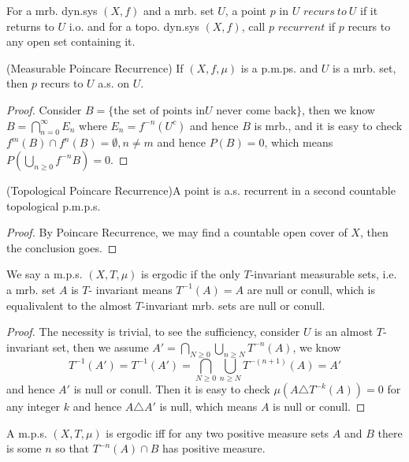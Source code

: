 \documentclass[lang=en, color=blue, ]{elegantbook}
\begin{document}
\begin{definition}
    For a mrb. dyn.sys $(X,f)$ and a mrb. set $U$, a point $p$ in $U$ $recurs\ to\ U$ if it returns to $U$ i.o. and for a topo. dyn.sys $(X,f)$, call $p$ $recurrent$ if $p$ recurs to any open set containing it.
\end{definition}
\begin{theorem}
    (Measurable Poincare Recurrence) If $(X,f,\mu)$ is a p.m.ps. and $U$ is a mrb. set, then $p$ recurs to $U$ a.s. on $U$.
\end{theorem}
\begin{proof}\par
Consider $B=\{\text{the set of points in} U\text{ never come back}\}$, then we know $B = \bigcap_{n=0}^{\infty}E_n$ where $E_n = f^{-n}(U^c)$ and hence $B$ is mrb., and it is easy to check $f^m(B)\cap f^n(B) = \emptyset, n\neq m$ and hence $P(B) = 0$, which means $P(\bigcup_{n\geq 0}f^{-n}{B}) = 0$.
\end{proof}
\begin{theorem}
(Topological Poincare Recurrence)A point is a.s. recurrent in a second countable topological p.m.p.s.
\end{theorem}
\begin{proof}\par
    By Poincare Recurrence, we may find a countable open cover of $X$, then the conclusion goes.
\end{proof}
\begin{definition}
    We say a m.p.s. $(X,T,\mu)$ is ergodic if the only $T$-invariant measurable sets, i.e. a mrb. set $A$ is $T$- invariant means $T^{-1}(A) = A$ are null or conull, which is equalivalent to the almost $T$-invariant mrb. sets are null or conull.
\end{definition}
\begin{proof}\par
    The necessity is trivial, to see the sufficiency, consider $U$ is an almost $T$-invariant set, then we assume $ A' = \bigcap_{N\geq 0}\bigcup_{n\geq N}T^{-n}(A)$, we know
    \[T^{-1}(A') = T^{-1}(A') = \bigcap_{N\geq 0}\bigcup_{n\geq N} T^{-(n+1)}(A) = A'\]
    and hence $A'$ is null or conull. Then it is easy to check $\mu(A\triangle  T^{-k}(A)) = 0$ for any integer $k$ and hence $A\triangle A'$ is null, which means $A$ is null or conull.
\end{proof}
\begin{lemma}
    A m.p.s. $(X,T,\mu)$ is ergodic iff for any two positive measure sets $A$ and $B$ there is some $n$ so that $T^{-n}(A)\cap B$ has positive measure.
\end{lemma}
\end{document}
